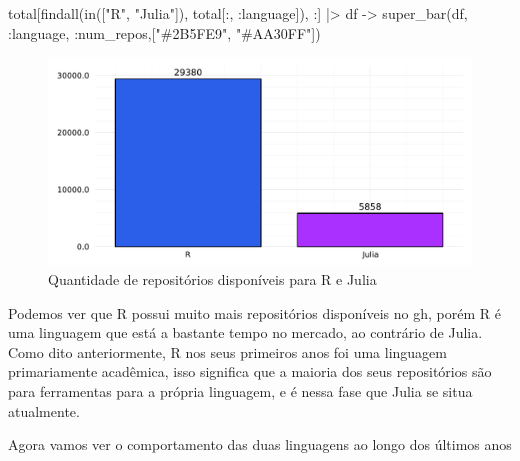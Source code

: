 \documentclass[
  letterpaper,
  DIV=11,
  numbers=noendperiod]{scrartcl}
\newenvironment{Shaded}{\begin{snugshade}}{\end{snugshade}}
\newcommand{\FunctionTok}[1]{\textcolor[rgb]{0.28,0.35,0.67}{#1}}
\newcommand{\NormalTok}[1]{\textcolor[rgb]{0.00,0.23,0.31}{#1}}
\newcommand{\OperatorTok}[1]{\textcolor[rgb]{0.37,0.37,0.37}{#1}}
\newcommand{\StringTok}[1]{\textcolor[rgb]{0.13,0.47,0.30}{#1}}
\begin{document}
\begin{Shaded}
\begin{Highlighting}[]
\NormalTok{total[}\FunctionTok{findall}\NormalTok{(}\FunctionTok{in}\NormalTok{([}\StringTok{"R"}\NormalTok{, }\StringTok{"Julia"}\NormalTok{]), total[}\OperatorTok{:}\NormalTok{, }\OperatorTok{:}\NormalTok{language]), }\OperatorTok{:}\NormalTok{] }\OperatorTok{|\textgreater{}}
\NormalTok{df }\OperatorTok{{-}\textgreater{}} \FunctionTok{super\_bar}\NormalTok{(df, }\OperatorTok{:}\NormalTok{language, }\OperatorTok{:}\NormalTok{num\_repos,[}\StringTok{"\#2B5FE9"}\NormalTok{, }\StringTok{"\#AA30FF"}\NormalTok{])}
\end{Highlighting}
\end{Shaded}

\begin{figure}[H]

{\centering \includegraphics{report_files/figure-pdf/cell-9-output-1.pdf}

}

\caption{Quantidade de repositórios disponíveis para R e Julia}

\end{figure}

Podemos ver que R possui muito mais repositórios disponíveis no gh,
porém R é uma linguagem que está a bastante tempo no mercado, ao
contrário de Julia. Como dito anteriormente, R nos seus primeiros anos
foi uma linguagem primariamente acadêmica, isso significa que a maioria
dos seus repositórios são para ferramentas para a própria linguagem, e é
nessa fase que Julia se situa atualmente.

Agora vamos ver o comportamento das duas linguagens ao longo dos últimos
anos
\end{document}
